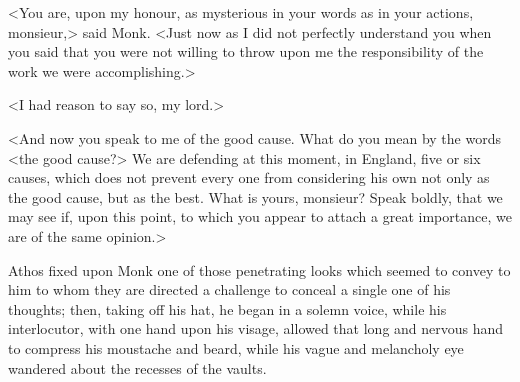 <You are, upon my honour, as mysterious in your words as in your actions, monsieur,> said Monk. <Just now as I did not perfectly understand you when you said that you were not willing to throw upon me the responsibility of the work we were accomplishing.>

<I had reason to say so, my lord.>

<And now you speak to me of the good cause. What do you mean by the words <the good cause?> We are defending at this moment, in England, five or six causes, which does not prevent every one from considering his own not only as the good cause, but as the best. What is yours, monsieur? Speak boldly, that we may see if, upon this point, to which you appear to attach a great importance, we are of the same opinion.>

Athos fixed upon Monk one of those penetrating looks which seemed to convey to him to whom they are directed a challenge to conceal a single one of his thoughts; then, taking off his hat, he began in a solemn voice, while his interlocutor, with one hand upon his visage, allowed that long and nervous hand to compress his moustache and beard, while his vague and melancholy eye wandered about the recesses of the vaults. 
